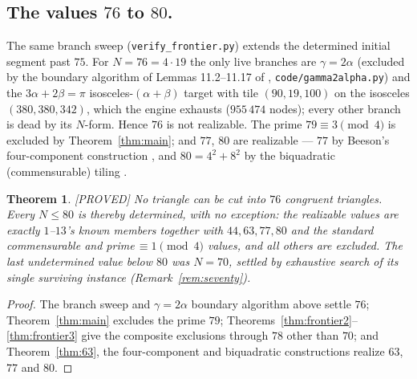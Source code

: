 \documentclass[11pt,reqno]{amsart}
\theoremstyle{plain}
\newtheorem{theorem}{Theorem}
\theoremstyle{definition}
\newcommand{\lab}[1]{\hfill\textnormal{\footnotesize\textsc{[#1]}}}
\begin{document}
\subsection*{The values $76$ to $80$.}
The same branch sweep (\texttt{verify\_frontier.py}) extends the determined initial segment past
$75$. For $N=76=4\cdot19$ the only live branches are $\gamma=2\alpha$ (excluded by the boundary
algorithm of Lemmas 11.2--11.17 of \cite{BeesonIso}, \texttt{code/gamma2alpha.py}) and the
$3\alpha+2\beta=\pi$ isosceles-$(\alpha{+}\beta)$ target with tile $(90,19,100)$ on the isosceles
$(380,380,342)$, which the engine exhausts ($955\,474$ nodes); every other branch is dead by its
$N$-form. Hence $76$ is not realizable. The prime $79\equiv3\pmod4$ is excluded by
Theorem~\ref{thm:main}; and $77$, $80$ are realizable --- $77$ by Beeson's four-component
construction \cite{BeesonIII}, and $80=4^2+8^2$ by the biquadratic (commensurable) tiling
\cite{BeesonSeven}.

\begin{theorem}\label{thm:frontier4}\lab{PROVED}
No triangle can be cut into $76$ congruent triangles. Every $N\le 80$ is thereby determined,
with no exception: the realizable values are exactly $1$--$13$'s known members together with
$44,63,77,80$ and the standard commensurable and prime\,$\equiv1\!\pmod4$ values, and all others
are excluded. The last undetermined value below $80$ was $N=70$, settled by exhaustive search of
its single surviving instance (Remark~\ref{rem:seventy}).
\end{theorem}
\begin{proof}
The branch sweep and $\gamma=2\alpha$ boundary algorithm above settle $76$; Theorem~\ref{thm:main}
excludes the prime $79$; Theorems~\ref{thm:frontier2}--\ref{thm:frontier3} give the composite
exclusions through $78$ other than $70$; and Theorem~\ref{thm:63}, the four-component and
biquadratic constructions realize $63$, $77$ and $80$.
\end{proof}
\end{document}
